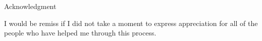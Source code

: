 \documentclass[12pt]{report}
\numberwithin{definition}{section}
\begin{document}
\begin{center}
Acknowledgment
\end{center}
    I would be remiss if I did not take a moment to express appreciation for all of the people who have helped me through this process.
    





	
\break

\tableofcontents


\newcommand{\comment}[1]{}


\break


\pagestyle{myheadings}
\end{document}
